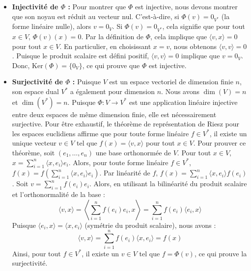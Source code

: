 \documentclass[11pt,a4paper]{report}
\begin{document}
\begin{enumerate}
\begin{itemize}
    Pour la propriété (b), évaluons \(\Phi(\lambda v_1)\) sur un vecteur
    arbitraire \(x \in V\):
    \[ \Phi(\lambda v_1)(x) = \langle \lambda v_1, x \rangle \] Par la
    bilinéarité du produit scalaire, nous avons :
    \[ \langle \lambda v_1, x \rangle = \lambda \langle v_1, x \rangle \]
    Par la définition de \(\Phi\), ceci est égal à :
    \[ \lambda \langle v_1, x \rangle = \lambda \Phi(v_1)(x) \] Par la
    définition de la multiplication d'une forme linéaire par un
    scalaire, nous avons :
    \[ \lambda \Phi(v_1)(x) = (\lambda \Phi(v_1))(x) \] Puisque cette
    égalité est vraie pour tout \(x \in V\), nous avons
    \(\Phi(\lambda v_1) = \lambda \Phi(v_1)\). Ainsi, \(\Phi\) est une
    application linéaire.
  \item
    \textbf{Injectivité de \(\Phi\) :} Pour montrer que \(\Phi\) est
    injective, nous devons montrer que son noyau est réduit au vecteur
    nul. C'est-à-dire, si \(\Phi(v) = 0_{V^*}\) (la forme linéaire
    nulle), alors \(v = 0_V\). Si \(\Phi(v) = 0_{V^*}\), cela signifie
    que pour tout \(x \in V\), \(\Phi(v)(x) = 0\). Par la définition de
    \(\Phi\), cela implique que \(\langle v, x \rangle = 0\) pour tout
    \(x \in V\). En particulier, en choisissant \(x = v\), nous obtenons
    \(\langle v, v \rangle = 0\). Puisque le produit scalaire est défini
    positif, \(\langle v, v \rangle = 0\) implique que \(v = 0_V\).
    Donc, \(\text{Ker}(\Phi) = \{0_V\}\), ce qui prouve que \(\Phi\) est
    injective.
  \item
    \textbf{Surjectivité de \(\Phi\) :} Puisque \(V\) est un espace
    vectoriel de dimension finie \(n\), son espace dual \(V^*\) a
    également pour dimension \(n\). Nous avons \(\dim(V) = n\) et
    \(\dim(V^*) = n\). Puisque \(\Phi: V \to V^*\) est une application
    linéaire injective entre deux espaces de même dimension finie, elle
    est nécessairement surjective. Pour être exhaustif, le théorème de
    représentation de Riesz pour les espaces euclidiens affirme que pour
    toute forme linéaire \(f \in V^*\), il existe un unique vecteur
    \(v \in V\) tel que \(f(x) = \langle v, x \rangle\) pour tout
    \(x \in V\). Pour prouver ce théorème, soit \((e_1, \dots, e_n)\)
    une base orthonormée de \(V\). Pour tout \(x \in V\),
    \(x = \sum_{i=1}^n \langle x, e_i \rangle e_i\). Alors, pour toute
    forme linéaire \(f \in V^*\),
    \(f(x) = f\left(\sum_{i=1}^n \langle x, e_i \rangle e_i\right)\).
    Par linéarité de \(f\),
    \(f(x) = \sum_{i=1}^n \langle x, e_i \rangle f(e_i)\). Soit
    \(v = \sum_{i=1}^n f(e_i) e_i\). Alors, en utilisant la bilinéarité
    du produit scalaire et l'orthonormalité de la base :
    \[ \langle v, x \rangle = \left\langle \sum_{i=1}^n f(e_i) e_i, x \right\rangle = \sum_{i=1}^n f(e_i) \langle e_i, x \rangle \]
    Puisque \(\langle e_i, x \rangle = \langle x, e_i \rangle\)
    (symétrie du produit scalaire), nous avons :
    \[ \langle v, x \rangle = \sum_{i=1}^n f(e_i) \langle x, e_i \rangle = f(x) \]
    Ainsi, pour tout \(f \in V^*\), il existe un \(v \in V\) tel que
    \(f = \Phi(v)\), ce qui prouve la surjectivité.
  \end{itemize}


\end{enumerate}
\end{document}

